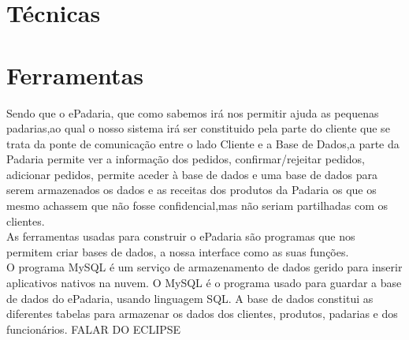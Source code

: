 \section{Técnicas}

\section{Ferramentas}
Sendo que o ePadaria, que como sabemos irá nos permitir ajuda as pequenas padarias,ao qual o nosso sistema irá ser constituido pela parte do cliente que se trata da ponte de comunicação entre o lado Cliente e a Base de Dados,a parte da Padaria permite ver a informação dos pedidos, confirmar/rejeitar pedidos, adicionar pedidos, permite aceder à base de dados e uma base de dados para serem armazenados os dados e as receitas dos produtos da Padaria os que os mesmo achassem que não fosse confidencial,mas não seriam partilhadas com os clientes.\\
As ferramentas usadas para construir o ePadaria são programas que nos permitem criar bases de dados, a nossa interface como as suas funções. \\
O programa MySQL é um serviço de armazenamento de dados gerido para inserir aplicativos nativos na nuvem. O MySQL é o programa usado para guardar a base de dados do ePadaria, usando linguagem SQL. A base de dados constitui as diferentes tabelas para armazenar os dados dos clientes, produtos, padarias e dos funcionários.
FALAR DO ECLIPSE